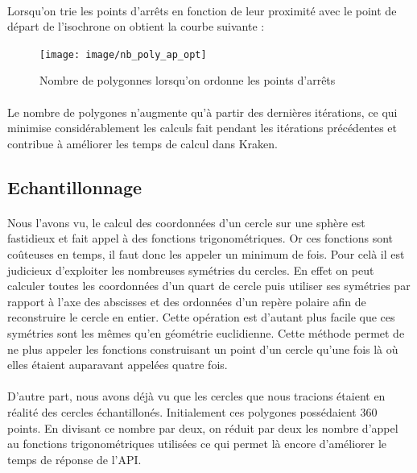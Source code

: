 \documentclass[a4paper]{report}
\begin{document}
\paragraph{} Lorsqu'on trie les points d'arrêts en fonction de leur proximité avec le point de départ de l'isochrone on obtient la courbe suivante :

\begin{figure}[H]
	\begin{center}
		\texttt{[image: image/nb\_poly\_ap\_opt]}
		\caption{Nombre de polygonnes lorsqu'on ordonne les points d'arrêts}
		\label{Nombre de polygonnes lorsqu'on ordonne les points d'arrêts}
	\end{center}
\end{figure}

\paragraph{} Le nombre de polygones n'augmente qu'à partir des dernières itérations, ce qui minimise considérablement les calculs fait pendant les itérations précédentes et contribue à améliorer les temps de calcul dans Kraken.

\subsection{Echantillonnage}

\paragraph{} Nous l'avons vu, le calcul des coordonnées d'un cercle sur une sphère est fastidieux et fait appel à des fonctions trigonométriques. Or ces fonctions sont coûteuses en temps, il faut donc les appeler un minimum de fois. Pour celà il est judicieux d'exploiter les nombreuses symétries du cercles. En effet on peut calculer toutes les coordonnées d'un quart de cercle puis utiliser ses symétries par rapport à l'axe des abscisses et des ordonnées d'un repère polaire afin de reconstruire le cercle en entier. Cette opération est d'autant plus facile que ces symétries sont les mêmes qu'en géométrie euclidienne. Cette méthode permet de ne plus appeler les fonctions construisant un point d'un cercle qu'une fois là où elles étaient auparavant appelées quatre fois.

\paragraph{} D'autre part, nous avons déjà vu que les cercles que nous tracions étaient en réalité des cercles échantillonés. Initialement ces polygones possédaient 360 points. En divisant ce nombre par deux, on réduit par deux les nombre d'appel au fonctions trigonométriques utilisées ce qui permet là encore d'améliorer le temps de réponse de l'API.
\end{document}
